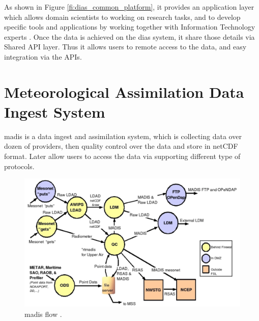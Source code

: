 As shown in Figure \ref{fi:dias_common_platform}, it provides an application layer which allows domain scientists to working on research tasks, and to develop specific tools and applications by working together with Information Technology experts \cite{Kawasaki2018DataReduction}. Once the data is achieved on the \acrshort{dias} system, it share those details via Shared API layer. Thus it allows users to remote access to the data, and easy integration via the APIs.



\section{Meteorological Assimilation Data Ingest System}
\label{se:madis}
\acrfull{madis} is a data ingest and assimilation system, which is collecting data over dozen of providers, then quality control over the data and store in \acrshort{netCDF} format. Later allow users to access the data via supporting different type of protocols.

\begin{figure}[htp]
    \centering
    \includegraphics[width=1\textwidth]{lit/other/madis_flow.png}
    \caption[\acrshort{madis} flow]{\acrshort{madis} flow \cite{Macdermaid2005ARCHITECTUREP2.39}.}
    \label{fi:madis_flow}
\end{figure}


